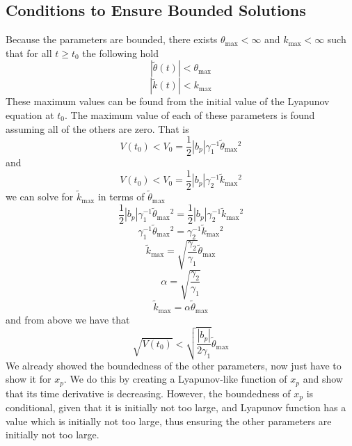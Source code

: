 \subsection{Conditions to Ensure Bounded Solutions}

Because the parameters are bounded, there exists $\theta_{\max}<\infty$ and $k_{\max}<\infty$ such that for all $t\geq t_{0}$ the following hold
\begin{equation*}
  |\tilde{\theta}(t)|<\theta_{\max}
\end{equation*}
\begin{equation*}
  |\tilde{k}(t)|<k_{\max}
\end{equation*}
These maximum values can be found from the initial value of the Lyapunov equation at $t_{0}$.
The maximum value of each of these parameters is found assuming all of the others are zero.
That is
\begin{equation*}
  V(t_{0})<V_{0}=\frac{1}{2}|b_{p}|\gamma_{1}^{-1}\tilde{\theta}_{\max}{}^{2}
\end{equation*}
and
\begin{equation*}
  V(t_{0})<V_{0}=\frac{1}{2}|b_{p}|\gamma_{2}^{-1}\tilde{k}_{\max}{}^{2}
\end{equation*}
we can solve for $\tilde{k}_{\max}$ in terms of $\tilde{\theta}_{\max}$
\begin{equation*}
  \frac{1}{2}|b_{p}|\gamma_{1}^{-1}\tilde{\theta}_{\max}{}^{2}=
  \frac{1}{2}|b_{p}|\gamma_{2}^{-1}\tilde{k}_{\max}{}^{2}
\end{equation*}
\begin{equation*}
  \gamma_{1}^{-1}\tilde{\theta}_{\max}{}^{2}=\gamma_{2}^{-1}\tilde{k}_{\max}{}^{2}
\end{equation*}
\begin{equation*}
  \tilde{k}_{\max}=\sqrt{\frac{\gamma_{2}}{\gamma_{1}}}\tilde{\theta}_{\max}
\end{equation*}
\begin{equation*}
  \alpha=\sqrt{\frac{\gamma_{2}}{\gamma_{1}}}
\end{equation*}
\begin{equation*}
  \tilde{k}_{\max}=\alpha\tilde{\theta}_{\max}
\end{equation*}
and from above we have that
\begin{equation*}
  \sqrt{V(t_{0})}<\sqrt{\frac{|b_{p}|}{2\gamma_{1}}}\tilde{\theta}_{\max}
\end{equation*}
We already showed the boundedness of the other parameters, now just have to show it for $x_{p}$.
We do this by creating a Lyapunov-like function of $x_{p}$ and show that its time derivative is decreasing.
However, the boundedness of $x_{p}$ is conditional, given that it is initially not too large, and Lyapunov function has a value which is initially not too large, thus ensuring the other parameters are initially not too large.


